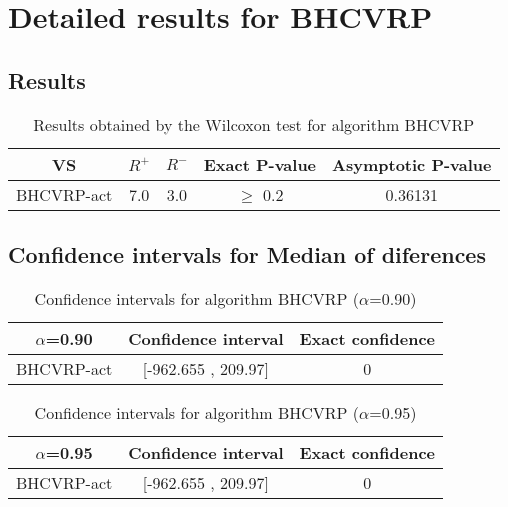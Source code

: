 \documentclass[a4paper,10pt]{article}
\begin{document}
 \clearpage 


\section{Detailed results for BHCVRP}


\subsection{Results}

\begin{table}[!htp]
\centering\small
\begin{tabular}{
|c|c|c|c|c|}
\hline
 VS & $R^{+}$ & $R^{-}$ & Exact P-value & Asymptotic P-value \\ \hline 
BHCVRP-act & 7.0 & 3.0 & $\geq$ 0.2 & 0.36131\\ \hline 

\end{tabular}
\caption{Results obtained by the Wilcoxon test for algorithm BHCVRP}
\end{table}

\subsection{Confidence intervals for Median of diferences}

\begin{table}[!htp]
\centering\small
\begin{tabular}{
|c|c|c|}
\hline
 $\alpha$=0.90 & Confidence interval & Exact confidence \\ \hline 
BHCVRP-act & [-962.655 , 209.97] & 0\\ \hline 

\end{tabular}
\caption{Confidence intervals for algorithm BHCVRP ($\alpha$=0.90)}
\end{table}
\begin{table}[!htp]
\centering\small
\begin{tabular}{
|c|c|c|}
\hline
 $\alpha$=0.95 & Confidence interval & Exact confidence \\ \hline 
BHCVRP-act & [-962.655 , 209.97] & 0\\ \hline 

\end{tabular}
\caption{Confidence intervals for algorithm BHCVRP ($\alpha$=0.95)}
\end{table}

 \clearpage 
\end{document}
